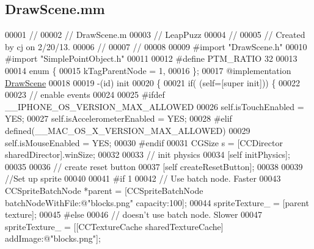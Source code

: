 \hypertarget{_draw_scene_8mm}{\subsection{Draw\-Scene.\-mm}
\label{df/d41/_draw_scene_8mm}
}

\begin{DoxyCode}
00001 \textcolor{comment}{//}
00002 \textcolor{comment}{//  DrawScene.m}
00003 \textcolor{comment}{//  LeapPuzz}
00004 \textcolor{comment}{//}
00005 \textcolor{comment}{//  Created by cj on 2/20/13.}
00006 \textcolor{comment}{//}
00007 \textcolor{comment}{//}
00008 
00009 \textcolor{preprocessor}{#import "DrawScene.h"}
00010 \textcolor{preprocessor}{#import "SimplePointObject.h"}
00011 
00012 \textcolor{preprocessor}{#define PTM\_RATIO 32}
00013 \textcolor{preprocessor}{}
00014 \textcolor{keyword}{enum} \{
00015     kTagParentNode = 1,
00016 \};
00017 \textcolor{keyword}{@implementation }\hyperlink{interface_draw_scene}{DrawScene}
00018 
00019 -(id) init
00020 \{
00021     \textcolor{keywordflow}{if}( (\textcolor{keyword}{self}=[super init])) \{
00022         
00023         \textcolor{comment}{// enable events}
00024         
00025 \textcolor{preprocessor}{#ifdef \_\_IPHONE\_OS\_VERSION\_MAX\_ALLOWED}
00026 \textcolor{preprocessor}{}        \textcolor{keyword}{self}.isTouchEnabled = YES;
00027         \textcolor{keyword}{self}.isAccelerometerEnabled = YES;
00028 \textcolor{preprocessor}{#elif defined(\_\_MAC\_OS\_X\_VERSION\_MAX\_ALLOWED)}
00029 \textcolor{preprocessor}{}        \textcolor{keyword}{self}.isMouseEnabled = YES;
00030 \textcolor{preprocessor}{#endif}
00031 \textcolor{preprocessor}{}        CGSize s = [CCDirector sharedDirector].winSize;
00032         
00033         \textcolor{comment}{// init physics}
00034         [\textcolor{keyword}{self} initPhysics];
00035         
00036         \textcolor{comment}{// create reset button}
00037         [\textcolor{keyword}{self} createResetButton];
00038         
00039         \textcolor{comment}{//Set up sprite}
00040         
00041 \textcolor{preprocessor}{#if 1}
00042 \textcolor{preprocessor}{}        \textcolor{comment}{// Use batch node. Faster}
00043         CCSpriteBatchNode *parent = [CCSpriteBatchNode batchNodeWithFile:@"blocks.png" capacity:100];
00044         spriteTexture\_ = [parent texture];
00045 \textcolor{preprocessor}{#else}
00046 \textcolor{preprocessor}{}        \textcolor{comment}{// doesn't use batch node. Slower}
00047         spriteTexture\_ = [[CCTextureCache sharedTextureCache] addImage:@"blocks.png"];

\end{DoxyCode}
